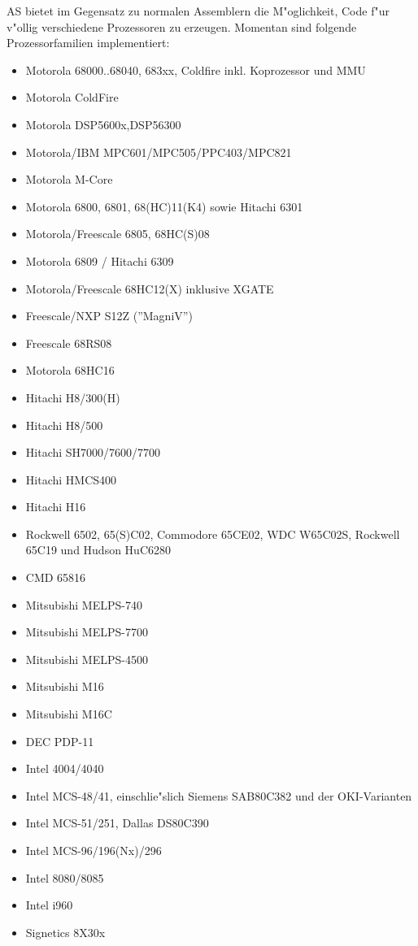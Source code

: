 \documentclass[12pt,a4paper,twoside]{report}
\begin{document}
AS bietet im Gegensatz zu normalen Assemblern die M"oglichkeit, Code
f"ur v"ollig verschiedene Prozessoren zu erzeugen.  Momentan sind
folgende Prozessorfamilien implementiert:
\begin{itemize}
\item{Motorola 68000..68040, 683xx, Coldfire inkl. Koprozessor und MMU}
\item{Motorola ColdFire}
\item{Motorola DSP5600x,DSP56300}
\item{Motorola/IBM MPC601/MPC505/PPC403/MPC821}
\item{Motorola M-Core}
\item{Motorola 6800, 6801, 68(HC)11(K4) sowie Hitachi 6301}
\item{Motorola/Freescale 6805, 68HC(S)08}
\item{Motorola 6809 / Hitachi 6309}
\item{Motorola/Freescale 68HC12(X) inklusive XGATE}
\item{Freescale/NXP S12Z (''MagniV'')}
\item{Freescale 68RS08}
\item{Motorola 68HC16}
\item{Hitachi H8/300(H)}
\item{Hitachi H8/500}
\item{Hitachi SH7000/7600/7700}
\item{Hitachi HMCS400}
\item{Hitachi H16}
\item{Rockwell 6502, 65(S)C02, Commodore 65CE02, WDC W65C02S, Rockwell 65C19 und
      Hudson HuC6280}
\item{CMD 65816}
\item{Mitsubishi MELPS-740}
\item{Mitsubishi MELPS-7700}
\item{Mitsubishi MELPS-4500}
\item{Mitsubishi M16}
\item{Mitsubishi M16C}
\item{DEC PDP-11}
\item{Intel 4004/4040}
\item{Intel MCS-48/41, einschlie"slich Siemens SAB80C382 und der
      OKI-Varianten}
\item{Intel MCS-51/251, Dallas DS80C390}
\item{Intel MCS-96/196(Nx)/296}
\item{Intel 8080/8085}
\item{Intel i960}
\item{Signetics 8X30x}

\end{itemize}
\end{document}
